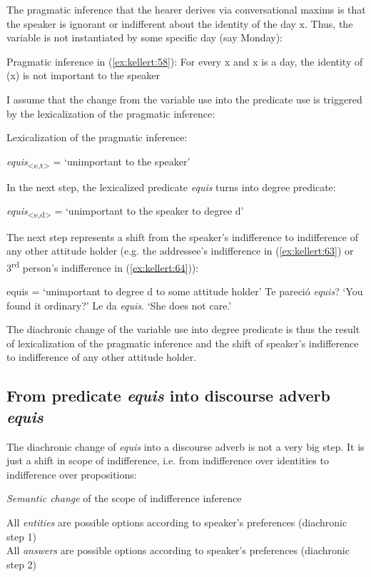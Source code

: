 \documentclass[output=paper]{langsci/langscibook}
\begin{document}
The pragmatic inference that the hearer derives via conversational maxims is that the speaker is ignorant or indifferent about the identity of the day x. Thus, the variable is not instantiated by some specific day (say Monday):

\ea\label{ex:kellert:59} Pragmatic inference in (\ref{ex:kellert:58}): For every x and x is a day, the identity of (x) is not important to the speaker
\z

I assume that the change from the variable use into the predicate use is triggered by the lexicalization of the pragmatic inference:

\ea\label{ex:kellert:60} Lexicalization of the pragmatic inference:\par
	\textit{equis}\textsubscript{<e,t>} = ‘unimportant to the speaker’
\z

In the next step, the lexicalized predicate \textit{equis} turns into degree predicate:

\ea\label{ex:kellert:} \textit{equis}\textsubscript{<e,d>} = ‘unimportant to the speaker to degree d’
\z

The next step represents a shift from the speaker’s indifference to indifference of any other attitude holder (e.g. the addressee’s indifference in (\ref{ex:kellert:63}) or 3\textsuperscript{rd} person’s indifference in (\ref{ex:kellert:64})):

\ea\label{ex:kellert:64}	equis = ‘unimportant to degree d to some attitude holder’
\ex  Te pareció \textit{equis}? ‘You found it ordinary?’
\ex  Le da \textit{equis}. ‘She does not care.’
\z

The diachronic change of the variable use into degree predicate is thus the result of lexicalization of the pragmatic inference and the shift of speaker’s indifference to indifference of any other attitude holder.


\subsection{From predicate \textit{equis} into discourse adverb \textit{equis}}\label{sec:kellert:4.2}
The diachronic change of \textit{equis} into a discourse adverb is not a very big step. It is just a shift in scope of indifference, i.e. from indifference over identities to indifference over propositions:

\ea\label{ex:kellert:65} \textit{Semantic change} of the scope of indifference inference\\
\begin{xlist}
\ex All \textit{entities} are possible options according to speaker’s preferences (diachronic step 1)\\
\ex All \textit{answers} are possible options according to speaker’s preferences (diachronic step 2)
\end{xlist}
\z
\end{document}
